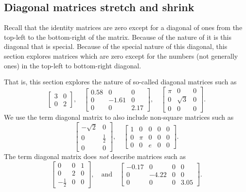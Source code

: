 \subsection{Diagonal matrices stretch and shrink}
\label{sec:dmd}

Recall that the identity matrices are zero except for a diagonal of ones from the top-left to the bottom-right of the matrix.
Because of the nature of  it is this diagonal that is special.
Because of the special nature of this diagonal, this section explores matrices which are zero except for the numbers (not generally ones) in the top-left to bottom-right diagonal.

\begin{example} \label{eg:4diag}
That is, this section explores the nature of so-called diagonal matrices such as
\begin{equation*}
\begin{bmatrix} 3&0\\0&2 \end{bmatrix},\quad
\begin{bmatrix} 0.58&0&0\\0&-1.61&0\\0&0&2.17 \end{bmatrix},\quad
\begin{bmatrix} \pi&0&0\\0&\sqrt3&0\\0&0&0 \end{bmatrix}.
\end{equation*}
We use the term {diagonal matrix} to also include non-square matrices such as
\begin{equation*}
\begin{bmatrix} -\sqrt2&0\\0&\frac12\\0&0 \end{bmatrix},\quad
\begin{bmatrix} 1&0&0&0&0\\0&\pi&0&0&0\\0&0&e&0&0 \end{bmatrix}.
\end{equation*}
The term diagonal matrix does \emph{not} describe matrices such as
\begin{equation*}
\begin{bmatrix} 0&0&1\\0&2&0\\-\frac12&0&0  \end{bmatrix}
,\quad\text{and}\quad
\begin{bmatrix} -0.17&0&0&0\\0&-4.22&0&0\\0&0&0&3.05 \end{bmatrix}.
\end{equation*}
\end{example}

